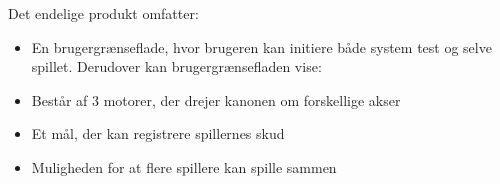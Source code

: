 Det endelige produkt omfatter:
\begin{itemize}
	\item{En brugergrænseflade, hvor brugeren kan initiere både system test og selve spillet. Derudover kan brugergrænsefladen vise:}
	\item{Består af 3 motorer, der drejer kanonen om forskellige akser}
	\item{Et mål, der kan registrere spillernes skud}
	\item {Muligheden for at flere spillere kan spille sammen}
\end{itemize}


